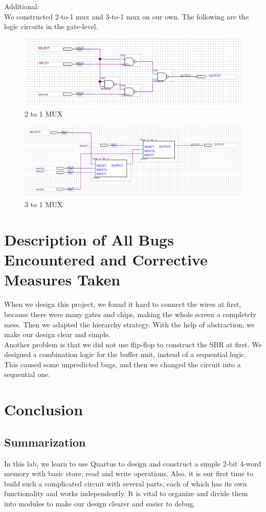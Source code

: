 \documentclass[12pt]{article}
\begin{document}
Additional: \\
We constructed 2-to-1 mux and 3-to-1 mux on our own. The following are the logic circuits in the gate-level. 
\begin{figure}[H]
    \centering
    \includegraphics[width=15cm]{2to1mux.png}
    \caption{2 to 1 MUX}
\end{figure}
\begin{figure}[H]
    \centering
    \includegraphics[width=15cm]{3to1mux.png}
    \caption{3 to 1 MUX}
\end{figure}

\section{Description of All Bugs Encountered and Corrective Measures Taken}
When we design this project, we found it hard to connect the wires at first, because there were many gates and chips, making the whole screen a completely mess. Then we adapted the hierarchy strategy. With the help of abstraction, we make our design clear and simple. \\

Another problem is that we did not use flip-flop to construct the SBR at first. We designed a combination logic for the buffer unit, instead of a sequential logic. This caused some unpredicted bugs, and then we changed the circuit into a sequential one. 


\section{Conclusion}
\subsection{\textbf{Summarization}}
In this lab, we learn to use Quartus to design and construct a simple 2-bit 4-word memory with basic store, read and write operations. Also, it is our first time to build such a complicated circuit with several parts, each of which has its own functionality and works independently. It is vital to organize and divide them into modules to make our design clearer and easier to debug.
\end{document}
